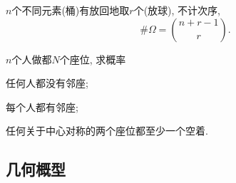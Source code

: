 \documentclass{ctexart}
\begin{document}
\begin{finale}
    $n$个不同元素(桶)有放回地取$r$个(放球), 不计次序,
    \[ \# \Omega = \binom{n+r-1}{r}. \]
\end{finale}
\begin{sample}
    \begin{ex}
        $n$个人做都$N$个座位, 求概率
        \begin{cenum}
            \item 任何人都没有邻座;
            \item 每个人都有邻座;
            \item 任何关于中心对称的两个座位都至少一个空着.
        \end{cenum}
    \end{ex}
\end{sample}



\subsection{几何概型} %
\label{sub:几何概型}
\end{document}
